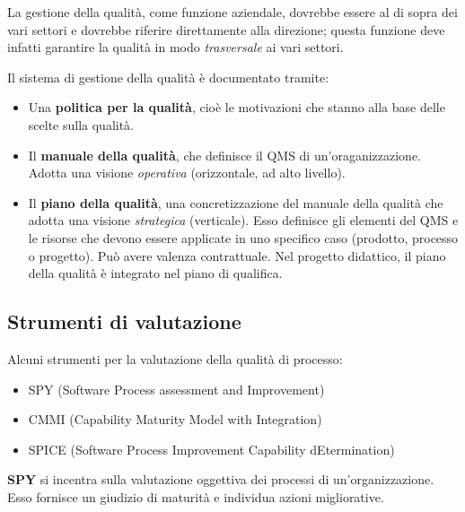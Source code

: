 \documentclass[a4paper]{article}
\begin{document}
		
La gestione della qualità, come funzione aziendale, dovrebbe essere al di sopra dei vari settori e dovrebbe riferire direttamente alla direzione; questa funzione deve infatti garantire la qualità in modo \emph{trasversale} ai vari settori.
		
Il sistema di gestione della qualità è documentato tramite:
		
	\begin{itemize}
		
			
	\item Una \textbf{politica per la qualità}, cioè le motivazioni che stanno alla base delle scelte sulla qualità.
			
	\item Il \textbf{manuale della qualità}, che definisce il QMS di un'oraganizzazione. Adotta una visione \emph{operativa} (orizzontale, ad alto livello).
			
	\item Il \textbf{piano della qualità}, una concretizzazione del manuale della qualità che adotta una visione \emph{strategica} (verticale). Esso definisce gli elementi del QMS e le risorse che devono essere applicate in uno specifico caso (prodotto, processo o progetto). Può avere valenza contrattuale. Nel progetto didattico, il piano della qualità è integrato nel piano di qualifica.
		
	\end{itemize}


		
	\subsection{Strumenti di valutazione}

		
Alcuni strumenti per la valutazione della qualità di processo:
		
	\begin{itemize}
		
			
	\item SPY (Software Process assessment and Improvement)
			
	\item CMMI (Capability Maturity Model with Integration)
			
	\item SPICE (Software Process Improvement Capability dEtermination)
		
	\end{itemize}

		
\textbf{SPY} si incentra sulla valutazione oggettiva dei processi di un'organizzazione. Esso fornisce un giudizio di maturità e individua azioni migliorative.
		
\end{document}
